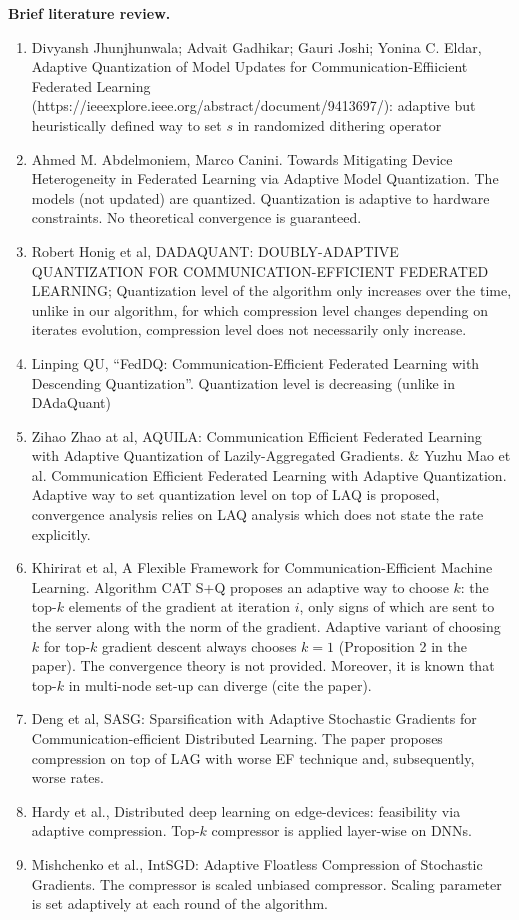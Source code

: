 \documentclass[nohyperref]{article}
\theoremstyle{plain}
\theoremstyle{definition}
\theoremstyle{remark}
\begin{document}
{\bfseries Brief literature review.} 
\begin{enumerate}
\item Divyansh Jhunjhunwala; Advait Gadhikar; Gauri Joshi; Yonina C. Eldar, Adaptive Quantization of Model Updates for Communication-Effiicient Federated Learning (https://ieeexplore.ieee.org/abstract/document/9413697/): adaptive but heuristically defined way to set $s$ in randomized dithering operator
\item Ahmed M. Abdelmoniem, Marco Canini. Towards Mitigating Device Heterogeneity in Federated Learning via Adaptive Model Quantization. The models (not updated) are quantized. Quantization is adaptive to hardware constraints. No theoretical convergence is guaranteed. 
\item Robert Honig et al, DADAQUANT: DOUBLY-ADAPTIVE QUANTIZATION FOR COMMUNICATION-EFFICIENT FEDERATED LEARNING; Quantization level of the algorithm only increases over the time, unlike in our algorithm, for which compression level changes depending on iterates evolution, compression level does not necessarily only increase. 
\item Linping QU, “FedDQ: Communication-Efficient Federated Learning with Descending Quantization”. Quantization level is decreasing (unlike in DAdaQuant)
\item Zihao Zhao at al, AQUILA: Communication Efficient Federated Learning with Adaptive Quantization of Lazily-Aggregated Gradients. \& Yuzhu Mao et al. Communication Efficient Federated Learning with Adaptive Quantization. Adaptive way to set quantization level on top of LAQ is proposed, convergence analysis relies on LAQ analysis which does not state the rate explicitly. 
\item Khirirat et al, A Flexible Framework for Communication-Efficient Machine Learning. Algorithm CAT S+Q proposes an adaptive way to choose $k$: the top-$k$ elements of the gradient at iteration $i$, only signs of which are sent to the server along with the norm of the gradient. Adaptive variant of choosing $k$ for top-$k$ gradient descent always chooses $k=1$ (Proposition 2 in the paper). The convergence theory is not provided. Moreover, it is known that top-$k$ in multi-node set-up can diverge (cite the paper). 
\item Deng et al, SASG: Sparsification with Adaptive Stochastic
Gradients for Communication-efficient
Distributed Learning. The paper proposes compression on top of LAG with worse EF technique and, subsequently, worse rates.
\item Hardy et al., Distributed deep learning on edge-devices:
feasibility via adaptive compression. Top-$k$ compressor is applied layer-wise on DNNs.
\item Mishchenko et al., IntSGD: Adaptive Floatless Compression of Stochastic Gradients. The compressor is scaled unbiased compressor. Scaling parameter is set adaptively at each round of the algorithm.
\end{enumerate}
\end{document}
